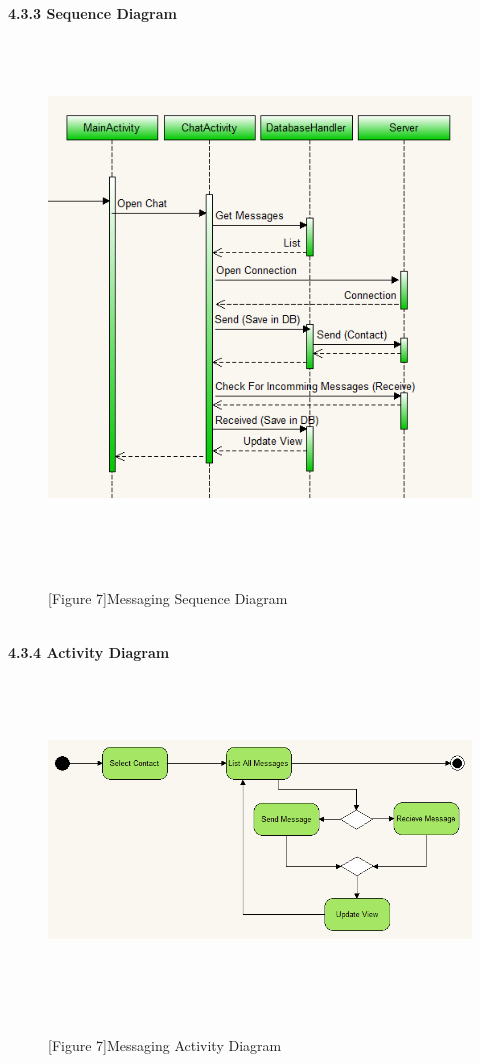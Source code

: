\documentclass[29pt,a4paper]{moderncv}
\begin{document}
\newpage
		\textbf{4.3.3 Sequence Diagram}
			\begin{figure}
				\centering
				\\ \includegraphics[width=5.5in, height=5.0in]{./mesActivity.png}
				\\\caption{[Figure 7]Messaging Sequence Diagram}\\
			\end{figure}	
\newpage
\\
		\left\textbf{4.3.4 Activity Diagram}
			\begin{figure}
				\centering
				\\ \includegraphics[width=5.5in, height=3.0in]{./acMessaging.png}
				\\\caption{[Figure 7]Messaging Activity Diagram}\\
			\end{figure}
		
\end{document}
